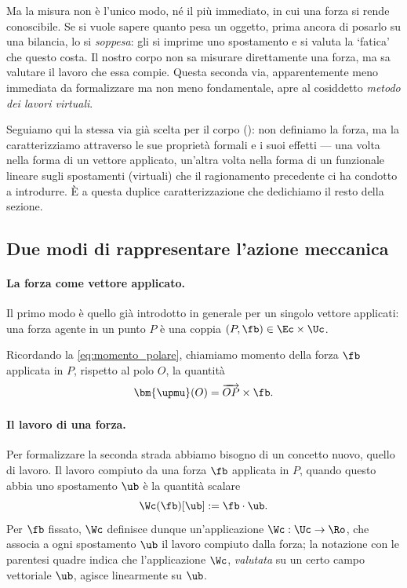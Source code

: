 Ma la misura non è l'unico modo, né il più immediato, in cui una forza
si rende conoscibile. Se si vuole sapere quanto pesa un oggetto, prima
ancora di posarlo su una bilancia, lo si \textit{soppesa}: gli si
imprime uno spostamento e si valuta la `fatica' che questo costa. Il nostro
corpo non sa misurare direttamente una forza, ma sa valutare il lavoro
che essa compie. Questa seconda via, apparentemente meno immediata da formalizzare ma
non meno fondamentale, apre al cosiddetto
\textit{metodo dei lavori virtuali}.



\medskip 

Seguiamo qui la stessa via già scelta per il corpo (): non
definiamo la forza, ma la caratterizziamo attraverso le sue proprietà
formali e i suoi effetti --- una volta nella forma di un vettore
applicato, un'altra volta nella forma di un funzionale lineare sugli
spostamenti (virtuali) che il ragionamento precedente ci ha condotto a
introdurre. È a questa duplice caratterizzazione che dedichiamo il resto
della sezione.



\subsection{Due modi di rappresentare l'azione meccanica}

\paragraph{La forza come vettore applicato.}


Il primo modo è quello già introdotto in generale per un singolo vettore
applicati: una forza agente in un punto
$P$  è una coppia $(P,\fb)\in \Ec\times\Uc$. 

Ricordando la \eqref{eq:momento_polare}, chiamiamo momento della forza $\fb$ applicata in $P$, rispetto al polo $O$, la quantità
\begin{equation}
		\bm{\upmu}(O) =\overrightarrow{OP} \times \fb.
\end{equation}


\paragraph{Il lavoro di una forza.}
Per formalizzare la seconda strada abbiamo bisogno di un concetto nuovo, quello di lavoro.
Il lavoro compiuto da una forza $\fb$ applicata in $P$, quando questo abbia uno spostamento $\ub$ è la
quantità scalare
\begin{equation}
\Wc(\fb)[\ub]:=\fb\cdot\ub.
\end{equation}
Per $\fb$ fissato, $\Wc$ definisce dunque un'applicazione $\Wc: \Uc\to\Ro$, che associa a ogni spostamento $\ub$ il lavoro compiuto dalla forza; la notazione
con le parentesi quadre indica che l'applicazione $\Wc$, \textit{valutata} su un certo campo vettoriale $\ub$, agisce linearmente su $\ub$.

